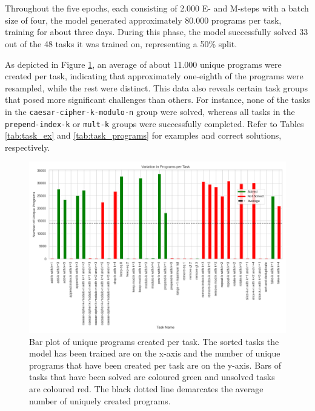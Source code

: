\section{}

\subsection{}
Throughout the five epochs, each consisting of 2.000 E- and M-steps with a batch size of four, the model generated approximately 80.000 programs per task, training for about three days. During this phase, the model successfully solved 33 out of the 48 tasks it was trained on, representing a 50\% split.

As depicted in Figure \ref{fig:program_variations_binary_train}, an average of about 11.000 unique programs were created per task, indicating that approximately one-eighth of the programs were resampled, while the rest were distinct. This data also reveals certain task groups that posed more significant challenges than others. For instance, none of the tasks in the \texttt{caesar-cipher-k-modulo-n} group were solved, whereas all tasks in the \texttt{prepend-index-k} or \texttt{mult-k} groups were successfully completed. Refer to Tables \ref{tab:task_ex} and \ref{tab:task_programs} for examples and correct solutions, respectively.

\begin{figure}[H]
    \centering
    \includegraphics[width=\textwidth]{../img/plot_program_variations_binary_train.png}
    \caption{Bar plot of unique programs created per task. The sorted tasks the model has been trained are on the x-axis and the number of unique programs that have been created per task are on the y-axis. Bars of tasks that have been solved are coloured green and unsolved tasks are coloured red. The black dotted line demarcates the average number of uniquely created programs.}
    \label{fig:program_variations_binary_train}
\end{figure}


